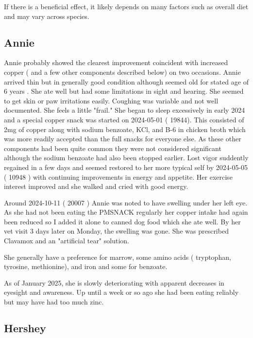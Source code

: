 If there is a beneficial effect, it likely depends on many factors
such as overall diet and may vary across species.


\subsection{Annie}

\mjmanniecu

Annie probably showed the clearest improvement
coincident with increased copper ( and a few other components
described below)  on two occasions. 
Annie arrived  thin but in generally good condition although 
seemed old for stated age of 6 years
. She ate well
but had some limitations in sight and hearing. She
seemed to get skin or paw irritations easily.
Coughing was variable and not well documented.
She feels a little "frail."
She began to sleep excessively in early 2024 
and a  special copper snack was started on 2024-05-01 ( 19844).
This consisted of 2mg of copper along with sodium benzoate, KCl,
and B-6 in chicken broth which was more readily accepted than the 
full snacks for everyone else. 
As these other components had been quite common they were not
considered significant although the sodium benzoate had also been 
stopped earlier. 
Lost vigor suddently regained in a few days
and seemed restored to her more typical self by
 2024-05-05 ( 10948 ) with continuing improvements in 
energy and appetite.
Her exercise interest improved and she walked and cried
with good energy. 

Around 2024-10-11 ( 20007 )  Annie was noted to have swelling under her
left eye. As she had not been eating the PMSNACK regularly her
copper intake had again been reduced so I added it alone to 
canned dog food which she ate well. By her vet visit 3 days
later on Monday, the swelling was gone.  
She was prescribed Clavamox and an "artificial tear" solution.

She generally have a preference for marrow, some amino acids
( tryptophan, tyrosine, methionine), and iron and some
for benzoate.  

As of January 2025, she is slowly deteriorating with apparent
decreases in eyesight and awareness. Up until a week or so ago
she had been eating reliably but may have had too much zinc.


\subsection{Hershey}

